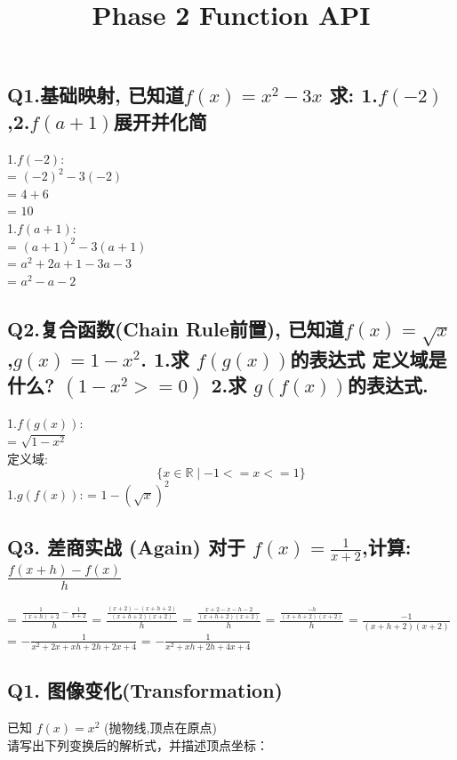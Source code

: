 \documentclass[12pt]{article}
\title{Phase 2 Function API}
\date{}
\begin{document}
\maketitle

\subsection*{Q1.基础映射, 已知道$f(x) = x^{2} - 3x$ 求: 1.$f(-2)$,2.$f(a+1)$展开并化简}
1.$f(-2)$: \\
= $(-2)^{2} - 3(-2)$ \\
= $4 + 6$ \\ 
= $10$ \\
1.$f(a+1)$: \\ 
= $(a+1)^{2} - 3(a+1)$ \\ 
= $a^{2} + 2a + 1 - 3a - 3$ \\
= $a^{2} - a -2$ \\ 

\subsection*{Q2.复合函数(Chain Rule前置), 已知道$f(x) = \sqrt{x}$,$g(x) = 1- x^{2}$.
1.求 $f(g(x))$的表达式 定义域是什么? $(1-x^{2} >= 0)$
2.求 $g(f(x))$的表达式.}
1.$f(g(x))$: \\ 
=  $\sqrt{1- x^{2}}$ \\    
定义域: \\ 
\[    
\{x\in\mathbb{R} \mid -1 <= x <= 1\}
\]
1.$g(f(x))$:
= $1-(\sqrt{x})^{2}$

\subsection*{Q3. 差商实战 (Again) 对于 $f(x)=\frac{1}{x+2}$,计算:
$\frac{f(x+h) - f(x)}{h}$}

= $\frac{\frac{1}{(x+h) + 2} - \frac{1}{x +2}}{h}$
= $\frac{\frac{(x+2) - (x+h +2)}{(x+ h + 2)(x+2)}}{h}$
= $\frac{\frac{ x + 2 - x - h - 2}{(x+ h + 2)(x+2)}}{h}$
= $\frac{\frac{-h}{(x+ h + 2)(x+2)}}{h}$
= $\frac{-1}{(x+ h + 2)(x+2)}$
= $-\frac{1}{ x^{2} + 2x + xh+ 2h + 2x +4}$
= $-\frac{1}{ x^{2} + xh+ 2h + 4x +4}$




\subsection*{Q1. 图像变化(Transformation)}
已知 $f(x) = x^{2}$ (抛物线,顶点在原点)\\
请写出下列变换后的解析式，并描述顶点坐标：\\
\end{document}
